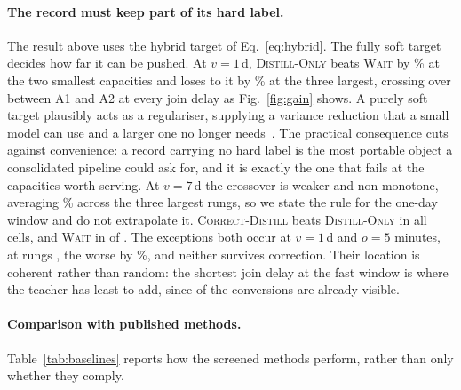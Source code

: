 \paragraph{The record must keep part of its hard label.}
The result above uses the hybrid target of Eq.~\eqref{eq:hybrid}. The fully soft target decides
how far it can be pushed. At $v=1$\,d, \textsc{Distill-Only} beats \textsc{Wait} by
\doOneSmallAbs{}\% at the two smallest capacities and loses to it by \doOneLargeAbs{}\% at the
three largest, crossing over between A1 and A2 at every join delay as Fig.~\ref{fig:gain} shows.
A purely soft target plausibly acts as a regulariser, supplying a variance reduction that a
small model can use and a larger one no longer needs~\cite{menon2021statistical}. The practical
consequence cuts against convenience: a record carrying no hard label is the most portable
object a consolidated pipeline could ask for, and it is exactly the one that fails at the
capacities worth serving. At $v=7$\,d the crossover is weaker and non-monotone, averaging
\doSevenLargeAbs{}\% across the three largest rungs, so we state the rule for the one-day window
and do not extrapolate it. \textsc{Correct-Distill} beats \textsc{Distill-Only} in all
\cdBeatDo{} cells, and \textsc{Wait} in \cdBeatWait{} of \nCellsBoth{}. The \cdNegN{} exceptions
both occur at $v=1$\,d and $o=5$ minutes, at rungs \cdNegWhere{}, the worse by
\cdNegWorstAbs{}\%, and neither survives correction. Their location is coherent rather than
random: the shortest join delay at the fast window is where the teacher has least to add, since
\foOneFive{} of the conversions are already visible.

\paragraph{Comparison with published methods.}
Table~\ref{tab:baselines} reports how the screened methods perform, rather than only whether
they comply.

\begin{table}[t]
\centering
\caption{Mean $\NE$ gain over \textsc{Wait} in percent, across the \nCells{} cells of each
window.}
\label{tab:baselines}

\end{table}

